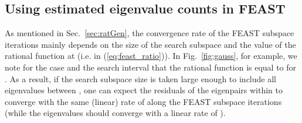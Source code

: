 \documentclass[12pt]{article}		\usepackage{tabls,multirow}
\begin{document}
\subsection{Using estimated eigenvalue counts in  FEAST}
As mentioned in Sec.~\ref{sec:ratGen}, the convergence rate of the
FEAST subspace iterations mainly depends on the size  of the
search subspace and the value of the rational function at
 (i.e.   in
(\ref{eq:feast_ratio})).
In Fig.~\ref{fig:gauss}, for example, we note for the case 
and the search interval  that the rational
function is equal to  for .  As a
result, if the search subspace size  is taken large enough to
include all eigenvalues between , one can expect the
residuals of the eigenpairs within  to converge with the
same (linear) rate of  along the FEAST subspace iterations
(while the eigenvalues should converge with a linear rate of
).  
\end{document}
